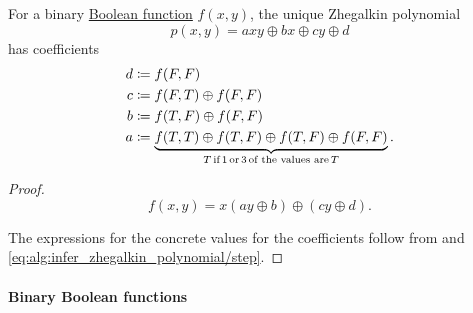 \begin{proposition}\label{thm:binary_boolean_function_zhegalkin_polynomial}
  For a binary \hyperref[def:boolean_function]{Boolean function} \( f(x, y) \), the unique Zhegalkin polynomial
  \begin{equation}\label{eq:thm:binary_boolean_function_zhegalkin_polynomial}
    p(x, y) = axy \oplus bx \oplus cy \oplus d
  \end{equation}
  has coefficients
  \begin{align*}
    d &\coloneqq f(F, F) \\
    c &\coloneqq f(F, T) \oplus f(F, F) \\
    b &\coloneqq f(T, F) \oplus f(F, F) \\
    a &\coloneqq \underbrace{f(T, T) \oplus f(T, F) \oplus f(T, F) \oplus f(F, F)}_{T \T*{if} 1 \T*{or} 3 \T*{of the values are} T}.
  \end{align*}
\end{proposition}
\begin{proof}
  \begin{equation*}
    f(x, y) = x(ay \oplus b) \oplus (cy \oplus d).
  \end{equation*}

  The expressions for the concrete values for the coefficients follow from  and \eqref{eq:alg:infer_zhegalkin_polynomial/step}.
\end{proof}

\paragraph{Binary Boolean functions}

